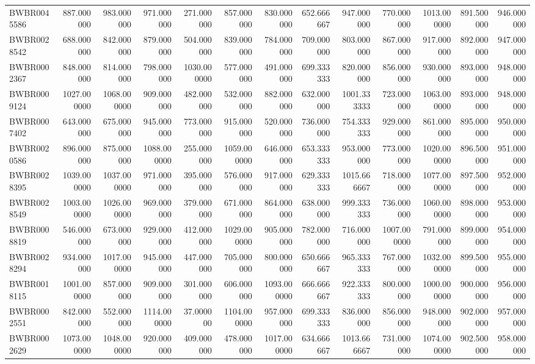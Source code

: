 \begin{longtable}{lrrrrrrrrrrrr}
BWBR0045586 & 887.000000 & 983.000000 & 971.000000 & 271.000000 & 857.000000 & 830.000000 & 652.666667 & 947.000000 & 770.000000 & 1013.000000 & 891.500000 & 946.000000 \\
BWBR0028542 & 688.000000 & 842.000000 & 879.000000 & 504.000000 & 839.000000 & 784.000000 & 709.000000 & 803.000000 & 867.000000 & 917.000000 & 892.000000 & 947.000000 \\
BWBR0002367 & 848.000000 & 814.000000 & 798.000000 & 1030.000000 & 577.000000 & 491.000000 & 699.333333 & 820.000000 & 856.000000 & 930.000000 & 893.000000 & 948.000000 \\
BWBR0009124 & 1027.000000 & 1068.000000 & 909.000000 & 482.000000 & 532.000000 & 882.000000 & 632.000000 & 1001.333333 & 723.000000 & 1063.000000 & 893.000000 & 948.000000 \\
BWBR0007402 & 643.000000 & 675.000000 & 945.000000 & 773.000000 & 915.000000 & 520.000000 & 736.000000 & 754.333333 & 929.000000 & 861.000000 & 895.000000 & 950.000000 \\
BWBR0020586 & 896.000000 & 875.000000 & 1088.000000 & 255.000000 & 1059.000000 & 646.000000 & 653.333333 & 953.000000 & 773.000000 & 1020.000000 & 896.500000 & 951.000000 \\
BWBR0028395 & 1039.000000 & 1037.000000 & 971.000000 & 395.000000 & 576.000000 & 917.000000 & 629.333333 & 1015.666667 & 718.000000 & 1077.000000 & 897.500000 & 952.000000 \\
BWBR0028549 & 1003.000000 & 1026.000000 & 969.000000 & 379.000000 & 671.000000 & 864.000000 & 638.000000 & 999.333333 & 736.000000 & 1060.000000 & 898.000000 & 953.000000 \\
BWBR0008819 & 546.000000 & 673.000000 & 929.000000 & 412.000000 & 1029.000000 & 905.000000 & 782.000000 & 716.000000 & 1007.000000 & 791.000000 & 899.000000 & 954.000000 \\
BWBR0028294 & 934.000000 & 1017.000000 & 945.000000 & 447.000000 & 705.000000 & 800.000000 & 650.666667 & 965.333333 & 767.000000 & 1032.000000 & 899.500000 & 955.000000 \\
BWBR0018115 & 1001.000000 & 857.000000 & 909.000000 & 301.000000 & 606.000000 & 1093.000000 & 666.666667 & 922.333333 & 800.000000 & 1000.000000 & 900.000000 & 956.000000 \\
BWBR0002551 & 842.000000 & 552.000000 & 1114.000000 & 37.000000 & 1104.000000 & 957.000000 & 699.333333 & 836.000000 & 856.000000 & 948.000000 & 902.000000 & 957.000000 \\
BWBR0002629 & 1073.000000 & 1048.000000 & 920.000000 & 409.000000 & 478.000000 & 1017.000000 & 634.666667 & 1013.666667 & 731.000000 & 1074.000000 & 902.500000 & 958.000000 \\

\end{longtable}
